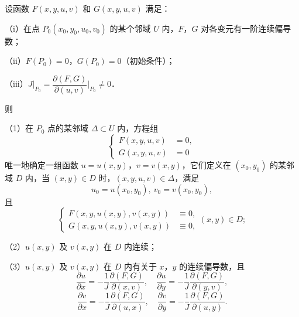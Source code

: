 \begin{theorem}\label{thm:17-3}
设函数 $F(x,y,u,v)$ 和 $G(x,y,u,v)$ 满足：

（i）在点 $P_{0}(x_{0},y_{0},u_{0},v_{0})$ 的某个邻域 $U$ 内，$F$，$G$ 对各变元有一阶连续偏导数；

（ii）$F(P_{0})=0$，$G(P_{0})=0$（初始条件）；

（iii）$J\big|_{P_{0}}=\dfrac{\partial(F,G)}{\partial(u,v)}\bigg|_{P_{0}}\neq0$．

则

（1）在 $P_{0}$ 点的某邻域 $\Delta\subset U$ 内，方程组
\begin{equation}
\left\{\begin{aligned}
F(x,y,u,v)&=0,\\
G(x,y,u,v)&=0
\end{aligned}\right.
\tag{1}
\end{equation}
唯一地确定一组函数 $u=u(x,y)$，$v=v(x,y)$，它们定义在 $(x_{0},y_{0})$ 的某邻域 $D$ 内，当 $(x,y)\in D$ 时，$(x,y,u,v)\in\Delta$，满足
\[
u_{0}=u(x_{0},y_{0}),\ v_{0}=v(x_{0},y_{0}),
\]
且
\[
\left\{\begin{aligned}
F(x,y,u(x,y),v(x,y))&\equiv0,\\
G(x,y,u(x,y),v(x,y))&\equiv0,
\end{aligned}\right.(x,y)\in D;
\]

（2）$u(x,y)$ 及 $v(x,y)$ 在 $D$ 内连续；

（3）$u(x,y)$ 及 $v(x,y)$ 在 $D$ 内有关于 $x$，$y$ 的连续偏导数，且
\[
\frac{\partial u}{\partial x}=-\frac{1}{J}\frac{\partial(F,G)}{\partial(x,v)},\quad \frac{\partial u}{\partial y}=-\frac{1}{J}\frac{\partial(F,G)}{\partial(y,v)},
\]
\[
\frac{\partial v}{\partial x}=-\frac{1}{J}\frac{\partial(F,G)}{\partial(u,x)},\quad \frac{\partial v}{\partial y}=-\frac{1}{J}\frac{\partial(F,G)}{\partial(u,y)}.
\]
\end{theorem}

